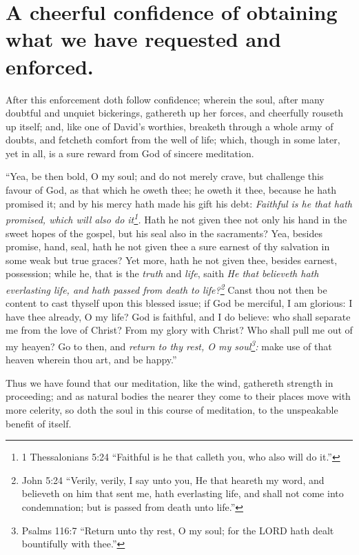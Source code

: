 \section{A cheerful confidence of obtaining what we have requested and enforced.}

After this enforcement doth follow confidence; wherein the soul, after many doubtful and unquiet bickerings, gathereth up her forces, and cheerfully rouseth up itself; and, like one of David's worthies, breaketh through a whole army of doubts, and fetcheth comfort from the well of life; which, though in some later, yet in all, is a sure reward from God of sincere meditation. 

``Yea, be then bold, O my soul; and do not merely crave, but challenge this favour of God, as that which he oweth thee; he oweth it thee, because he hath promised it; and by his mercy hath made his gift his debt: \emph{Faithful is he that hath promised, which will also do it\footnote{1 Thessalonians 5:24 ``Faithful is he that calleth you, who also will do it.''}.} Hath he not given thee not only his hand in the sweet hopes of the gospel, but his seal also in the sacraments? Yea, besides promise, hand, seal, hath he not given thee a sure earnest of thy salvation in some weak but true graces? Yet more, hath he not given thee, besides earnest, possession; while he, that is the \emph{truth} and \emph{life}, saith \emph{He that believeth hath everlasting life, and hath passed from death to life?\footnote{John 5:24 ``Verily, verily, I say unto you, He that heareth my word, and believeth on him that sent me, hath everlasting life, and shall not come into condemnation; but is passed from death unto life.''}} Canst thou not then be content to cast thyself upon this blessed issue; if God be merciful, I am glorious: I have thee already, O my life? God is faithful, and I do believe: who shall separate me from the love of Christ? From my glory with Christ? Who shall pull me out of my heayen? Go to then, and \emph{return to thy rest, O my soul\footnote{Psalms 116:7 ``Return unto thy rest, O my soul; for the LORD hath dealt bountifully with thee.''}:} make use of that heaven wherein thou art, and be happy.''

Thus we have found that our meditation, like the wind, gathereth strength in proceeding; and as natural bodies the nearer they come to their places move with more celerity, so doth the soul in this course of meditation, to the unspeakable benefit of itself. 